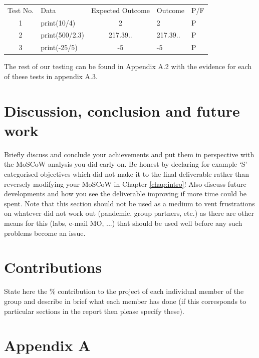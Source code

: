 \documentclass[a4paper, oneside, 11pt]{report}
\begin{document}
\begin{table}
\begin{tabular}{clcll}
\multicolumn{1}{l}{Test No.} & Data            & \multicolumn{1}{l}{Expected Outcome}  & Outcome & P/F \\
1                            & print(10/4)      & 2                                    &  2       & P    \\
2                            & print(500/2.3)   & 217.39..                                   &  217.39..       &    P \\
3                            & print(-25/5)    & -5                                   &     -5    &   P  \\ \hline
\end{tabular}
\end{table}

The rest of our testing can be found in Appendix A.2 with the evidence for each of these tests in appendix A.3.

\chapter{Discussion, conclusion and future work}

Briefly discuss and conclude your achievements and put them in perspective with the MoSCoW analysis you did early on. Be honest by declaring for example `S' categorised objectives which did not make it to the final deliverable rather than reversely modifying your MoSCoW in Chapter \ref{chap:intro}! Also discuss future developments and how you see the deliverable improving if more time could be spent. Note that this section should not be used as a medium to vent frustrations on whatever did not work out (pandemic, group partners, etc.) as there are other means for this (labs, e-mail MO, ...) that should be used well before any such problems become an issue.





\chapter*{Contributions}

State here the \% contribution to the project of each individual member of the group and describe in brief what each member has done (if this corresponds to particular sections in the report then please specify these).

\chapter*{Appendix A}
\end{document}
